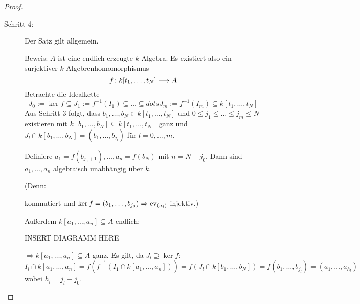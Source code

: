 \documentclass[12pt,a4paper]{scrartcl}
\theoremstyle{cplain}
\theoremstyle{cdef}
\begin{document}
\begin{proof}
\begin{description}
		\item[Schritt 4:] Der Satz gilt allgemein.
		
		Beweis: $A$ ist eine endlich erzeugte $k$-Algebra. Es existiert also ein surjektiver $k$-Algebrenhomomorphismus
		$$f\colon k[t_1,\dots, t_N]\longrightarrow A$$
		Betrachte die Idealkette 
		$$J_0 := \ker f\subseteq J_1 := f^{-1}(I_1)\subseteq\dots \subseteq dots J_m := f^{-1}(I_m)\subseteq k[t_1,\dots, t_N]$$
		Aus Schritt 3 folgt, dass $b_1,\dots, b_N\in k[t_1,\dots, t_N]$ und $0\le j_1\le\dots\le j_m\le N$ existieren mit $k[b_1,\dots, b_N]\subseteq k[t_1,\dots, t_N]$ ganz und $J_l\cap k[b_1,\dots, b_N] = (b_1,\dots, b_{j_l})$ für $l = 0,\dots, m$.
		
		Definiere $a_1 = f(b_{j_0+1}),\dots, a_n = f(b_{N})$ mit $n = N-j_0$. Dann sind $a_1,\dots, a_n$ algebraisch unabhängig über $k$.
		
		(Denn: \begin{center}
		\end{center}
		kommutiert und $\operatorname{ker} f = (b_1,\dots, b_{j_0}) \Rightarrow \operatorname{ev}_{(a_i)}$ injektiv.)
		
		Außerdem $k[a_1,\dots, a_n]\subseteq A$ endlich:
		
		INSERT DIAGRAMM HERE
		
		$\Rightarrow k[a_1,\dots, a_n]\subseteq A$ ganz. Es gilt, da $J_l\supseteq \ker f$:
		$$I_l\cap k[a_1,\dots, a_n] = \overline{f}(\overline{f}^{-1}(I_1\cap k[a_1,\dots, a_n])) = \overline{f}(J_l\cap k[b_1,\dots, b_N]) = \overline{f}(b_1,\dots, b_{j_l}) = (a_1,\dots, a_{h_l})$$
		wobei $h_l = j_l-j_0$.
		

\end{description}
\end{proof}
\end{document}
